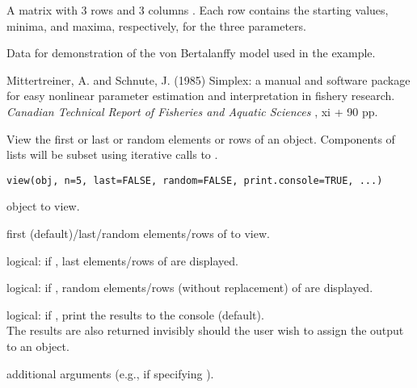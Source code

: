\documentclass[letterpaper]{book}
\begin{document}
%
\begin{Format}
A matrix with 3 rows and 3 columns . Each row contains 
the starting values, minima, and maxima, respectively, for the three parameters.
\end{Format}
%
\begin{Details}\relax
Data for demonstration of the von Bertalanffy model used in 
the  example.
\end{Details}
%
\begin{References}\relax
Mittertreiner, A. and Schnute, J. (1985) Simplex: a manual and software package 
for easy nonlinear parameter estimation and interpretation in fishery research. 
\emph{Canadian Technical Report of Fisheries and Aquatic Sciences} , xi + 90 pp. 
\end{References}
%
\begin{Description}\relax
View the first or last or random  elements or rows of an object. 
Components of lists will be subset using iterative calls to .
\end{Description}
%
\begin{Usage}
\begin{verbatim}
view(obj, n=5, last=FALSE, random=FALSE, print.console=TRUE, ...)
\end{verbatim}
\end{Usage}
%
\begin{Arguments}
\begin{ldescription}
\item[\code{obj}] object to view.
\item[\code{n}] first (default)/last/random  elements/rows of  to view.
\item[\code{last}] logical: if , last  elements/rows of  are displayed.
\item[\code{random}] logical: if ,  random elements/rows 
(without replacement) of  are displayed.
\item[\code{print.console}] logical: if , print the results to the console (default).\\{}
The results are also returned invisibly should the user wish to assign the output to an object.
\item[\code{...}] additional arguments (e.g.,  if specifying ).
\end{ldescription}
\end{Arguments}
\end{document}
